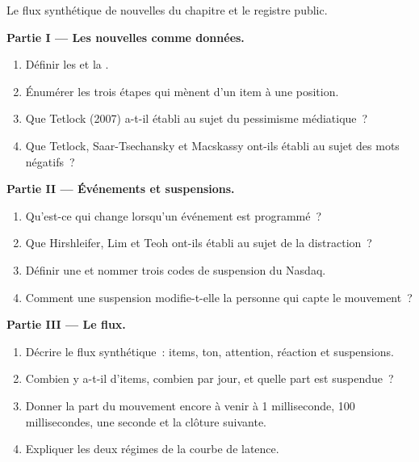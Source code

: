 \begin{problem}\label{pb:s1:news-and-events:1}
Le flux synthétique de nouvelles du chapitre et le registre public.

\medskip\noindent\textbf{Partie I --- Les nouvelles comme données.}
\begin{enumerate}
\item Définir les  et la .
\item Énumérer les trois étapes qui mènent d'un item à une position.
\item Que Tetlock (2007) a-t-il établi au sujet du pessimisme médiatique~?
\item Que Tetlock, Saar-Tsechansky et Macskassy ont-ils établi au sujet des mots négatifs~?
\end{enumerate}

\medskip\noindent\textbf{Partie II --- Événements et suspensions.}
\begin{enumerate}[resume]
\item Qu'est-ce qui change lorsqu'un événement est programmé~?
\item Que Hirshleifer, Lim et Teoh ont-ils établi au sujet de la distraction~?
\item Définir une  et nommer trois codes de suspension du Nasdaq.
\item Comment une suspension modifie-t-elle la personne qui capte le mouvement~?
\end{enumerate}

\medskip\noindent\textbf{Partie III --- Le flux.}
\begin{enumerate}[resume]
\item Décrire le flux synthétique~: items, ton, attention, réaction et suspensions.
\item Combien y a-t-il d'items, combien par jour, et quelle part est suspendue~?
\item Donner la part du mouvement encore à venir à 1 milliseconde, 100 millisecondes, une seconde et la clôture suivante.
\item Expliquer les deux régimes de la courbe de latence.
\end{enumerate}


\end{problem}
